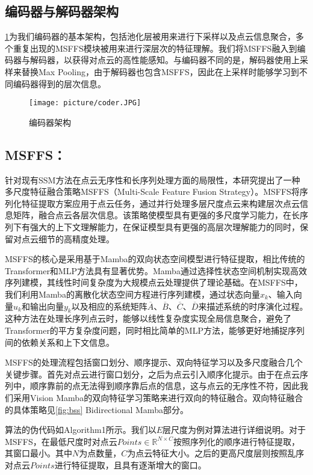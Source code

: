 \documentclass[preprint,12pt]{elsarticle}
\begin{document}
\subsection{编码器与解码器架构}
\cref{fig:coder}为我们编码器的基本架构，包括池化层被用来进行下采样以及点云信息聚合，多个重复出现的MSFFS模块被用来进行深层次的特征理解。我们将MSFFS融入到编码器与解码器，以获得对点云的高性能感知。与编码器不同的是，解码器使用上采样来替换Max Pooling，由于解码器也包含MSFFS，因此在上采样时能够学习到不同编码器得到的层次信息。

\begin{figure}[htbp]
	\centering
	\texttt{[image: picture/coder.JPG]}
	\caption{编码器架构}
	\label{fig:coder}
\end{figure}

\subsection{MSFFS：}
针对现有SSM方法在点云无序性和长序列处理方面的局限性，本研究提出了一种多尺度特征融合策略MSFFS（Multi-Scale Feature Fusion Strategy）。MSFFS将序列化特征提取方案应用于点云任务，通过并行处理多层尺度点云来构建层次点云信息矩阵，融合点云各层次信息。该策略使模型具有更强的多尺度学习能力，在长序列下有强大的上下文理解能力，在保证模型具有更强的高层次理解能力的同时，保留对点云细节的高精度处理。

MSFFS的核心是采用基于Mamba的双向状态空间模型进行特征提取，相比传统的Transformer和MLP方法具有显著优势。Mamba通过选择性状态空间机制实现高效序列建模，其线性时间复杂度为大规模点云处理提供了理论基础。在MSFFS中，我们利用Mamba的离散化状态空间方程进行序列建模，通过状态向量$x_k$、输入向量$u_k$和输出向量$y_k$以及相应的系统矩阵$\overline{A}$、$\overline{B}$、$\overline{C}$、$\overline{D}$来描述系统的时序演化过程。这种方法在处理长序列点云时，能够以线性复杂度实现全局信息聚合，避免了Transformer的平方复杂度问题，同时相比简单的MLP方法，能够更好地捕捉序列间的依赖关系和上下文信息。

MSFFS的处理流程包括窗口划分、顺序提示、双向特征学习以及多尺度融合几个关键步骤。首先对点云进行窗口划分，之后为点云引入顺序化提示。由于在点云序列中，顺序靠前的点无法得到顺序靠后点的信息，这与点云的无序性不符，因此我们采用Vision Mamba\cite{VisionMamba}的双向特征学习策略来进行双向的特征融合。双向特征融合的具体策略见\cref{fig:bss} Bidirectional Mamba部分。

算法的伪代码如Algorithm1所示。我们以$E$层尺度为例对算法进行详细说明。对于MSFFS，在最低尺度时对点云$Points\in\mathbb{R}^{N\times{C}}$按照序列化的顺序进行特征提取，其窗口最小。其中$N$为点数量，$C$为点云特征大小。之后的更高尺度层则按照乱序对点云$Points$进行特征提取，且具有逐渐增大的窗口。
\end{document}
